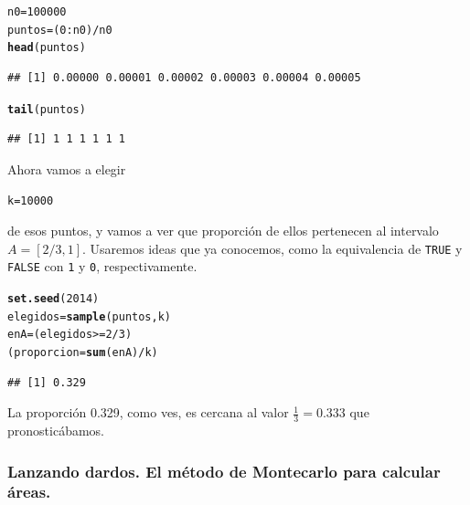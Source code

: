 \documentclass[10pt,a4paper]{article}\usepackage[]{graphicx}\usepackage[]{color}
\makeatletter
\newcommand{\hlnum}[1]{\textcolor[rgb]{0.686,0.059,0.569}{#1}}%
\newcommand{\hlopt}[1]{\textcolor[rgb]{0,0,0}{#1}}%
\newcommand{\hlstd}[1]{\textcolor[rgb]{0.345,0.345,0.345}{#1}}%
\newcommand{\hlkwb}[1]{\textcolor[rgb]{0.69,0.353,0.396}{#1}}%
\newcommand{\hlkwd}[1]{\textcolor[rgb]{0.737,0.353,0.396}{\textbf{#1}}}%
\newenvironment{kframe}{%
 \def\at@end@of@kframe{}%
 \ifinner\ifhmode%
  \def\at@end@of@kframe{\end{minipage}}%
  \begin{minipage}{\columnwidth}%
 \fi\fi%
 \def\FrameCommand##1{\hskip\@totalleftmargin \hskip-\fboxsep
 \colorbox{shadecolor}{##1}\hskip-\fboxsep
     \hskip-\linewidth \hskip-\@totalleftmargin \hskip\columnwidth}%
 \MakeFramed {\advance\hsize-\width
   \@totalleftmargin\z@ \linewidth\hsize
   \@setminipage}}%
 {\par\unskip\endMakeFramed%
 \at@end@of@kframe}
\newenvironment{knitrout}{}{} %
\makeatother
\begin{document}
\begin{knitrout}
\color{fgcolor}\begin{kframe}
\begin{alltt}
\hlstd{n0} \hlkwb{=} \hlnum{100000}
\hlstd{puntos} \hlkwb{=} \hlstd{(}\hlnum{0}\hlopt{:}\hlstd{n0)}\hlopt{/}\hlstd{n0}
\hlkwd{head}\hlstd{(puntos)}
\end{alltt}
\begin{verbatim}
## [1] 0.00000 0.00001 0.00002 0.00003 0.00004 0.00005
\end{verbatim}
\begin{alltt}
\hlkwd{tail}\hlstd{(puntos)}
\end{alltt}
\begin{verbatim}
## [1] 1 1 1 1 1 1
\end{verbatim}
\end{kframe}
\end{knitrout}
     Ahora vamos a elegir
\begin{knitrout}
\color{fgcolor}\begin{kframe}
\begin{alltt}
     \hlstd{k} \hlkwb{=} \hlnum{10000}
\end{alltt}
\end{kframe}
\end{knitrout}
     de esos puntos, y vamos a ver que proporción de ellos pertenecen al intervalo $A=[2/3, 1]$. Usaremos ideas que ya conocemos, como la equivalencia de {\tt TRUE} y {\tt FALSE} con {\tt 1} y {\tt 0}, respectivamente.
\begin{knitrout}
\color{fgcolor}\begin{kframe}
\begin{alltt}
     \hlkwd{set.seed}\hlstd{(}\hlnum{2014}\hlstd{)}
\hlstd{elegidos} \hlkwb{=} \hlkwd{sample}\hlstd{(puntos, k)}
\hlstd{enA} \hlkwb{=} \hlstd{(elegidos} \hlopt{>=} \hlnum{2}\hlopt{/}\hlnum{3}\hlstd{)}
\hlstd{(proporcion} \hlkwb{=} \hlkwd{sum}\hlstd{(enA)} \hlopt{/} \hlstd{k)}
\end{alltt}
\begin{verbatim}
## [1] 0.329
\end{verbatim}
\end{kframe}
\end{knitrout}
     La proporción 0.329, como ves, es cercana al valor $\frac{1}{3}=$0.333 que pronosticábamos.

\subsubsection{Lanzando dardos. El método de Montecarlo para calcular áreas.}
\end{document}
